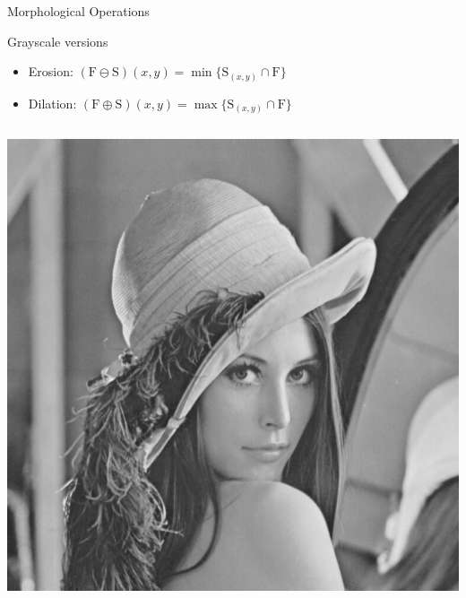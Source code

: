 \begin{frame}{Morphological Operations}
    \begin{block}{Grayscale versions}
        \begin{itemize}
            \item Erosion:
                  $(\mathrm{F}\ominus \mathrm{S})(x,y) = \min \big\lbrace \mathrm{S}_{(x,y)} \cap \mathrm{F}\big\rbrace$
            \item Dilation:
                  $(\mathrm{F}\oplus \mathrm{S})(x,y) = \max \big\lbrace \mathrm{S}_{(x,y)} \cap \mathrm{F}\big\rbrace$
        \end{itemize}
    \end{block}

    \begin{columns}[onlytextwidth,T]
        \begin{column}{0.3\textwidth}
            \centering{}
            \includegraphics[height=0.5\textheight]{img/lena_bw}


\end{column}
\end{columns}
\end{frame}
